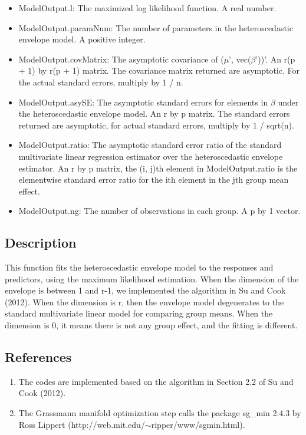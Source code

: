 \documentclass[a4paper,11pt,openany]{memoir}
\begin{document}
\begin{itemize}
   \item ModelOutput.l: The maximized log likelihood function.  A real number.
   \item ModelOutput.paramNum: The number of parameters in the heteroscedastic envelope model.  A positive integer.
   \item ModelOutput.covMatrix: The asymptotic covariance of ($\mu$', vec($\beta$'))'.  An r(p + 1) by r(p + 1) matrix.  The covariance matrix returned are asymptotic.  For the actual standard errors, multiply by 1 / n.
   \item ModelOutput.asySE: The asymptotic standard errors for elements in $\beta$ under the heteroscedastic envelope model. An r by p matrix.  The standard errors returned are asymptotic, for actual standard errors, multiply by 1 / sqrt(n).
   \item ModelOutput.ratio: The asymptotic standard error ratio of the standard multivariate linear regression estimator over the heteroscedastic envelope estimator. An r by p matrix, the (i, j)th element in ModelOutput.ratio is the elementwise standard error ratio for the ith element in the jth group mean effect.
   \item ModelOutput.ng: The number of observations in each group.  A p by 1 vector.
\end{itemize}


\subsection*{Description}

\begin{par}
This function fits the heteroscedastic envelope model to the responses and predictors, using the maximum likelihood estimation.  When the dimension of the envelope is between 1 and r-1, we implemented the algorithm in Su and Cook (2012). When the dimension is r, then the envelope model degenerates to the standard multivariate linear model for comparing group means.  When the dimension is 0, it means there is not any group effect, and the fitting is different.
\end{par} \vspace{1em}


\subsection*{References}

\begin{enumerate}
\setlength{\itemsep}{-1ex}
   \item The codes are implemented based on the algorithm in Section 2.2 of Su and Cook (2012).
   \item The Grassmann manifold optimization step calls the package sg\_min 2.4.3 by Ross Lippert (http://web.mit.edu/$\sim$ripper/www/sgmin.html).
\end{enumerate}
\end{document}
